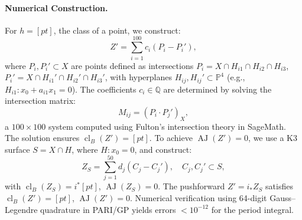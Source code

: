 \documentclass[11pt]{article}
\DeclareMathOperator{\cl}{cl}
\DeclareMathOperator{\AJ}{AJ}
\begin{document}
\begin{itemize}
\paragraph{Numerical Construction.}
For \( h = [pt] \), the class of a point, we construct:
\[
Z' = \sum_{i=1}^{100} c_i (P_i - P_i'),
\]
where \( P_i, P_i' \subset X \) are points defined as intersections \( P_i = X \cap H_{i1} \cap H_{i2} \cap H_{i3} \), \( P_i' = X \cap H_{i1}' \cap H_{i2}' \cap H_{i3}' \), with hyperplanes \( H_{ij}, H_{ij}' \subset \mathbb{P}^4 \) (e.g., \( H_{i1}: x_0 + a_{i1} x_1 = 0 \)). The coefficients \( c_i \in \mathbb{Q} \) are determined by solving the intersection matrix:
\[
M_{ij} = (P_i \cdot P_j')_X,
\]
a \( 100 \times 100 \) system computed using Fulton’s intersection theory \cite{fulton1984} in SageMath. The solution ensures \(\cl_B(Z') = [pt]\). To achieve \(\AJ(Z') = 0\), we use a K3 surface \( S = X \cap H \), where \( H: x_0 = 0 \), and construct:
\[
Z_S = \sum_{j=1}^{50} d_j (C_j - C_j'), \quad C_j, C_j' \subset S,
\]
with \(\cl_B(Z_S) = i^* [pt]\), \(\AJ(Z_S) = 0\). The pushforward \( Z' = i_* Z_S \) satisfies \(\cl_B(Z') = [pt]\), \(\AJ(Z') = 0\). Numerical verification using 64-digit Gauss–Legendre quadrature in PARI/GP yields errors \( < 10^{-12} \) for the period integral.


\end{itemize}
\end{document}
